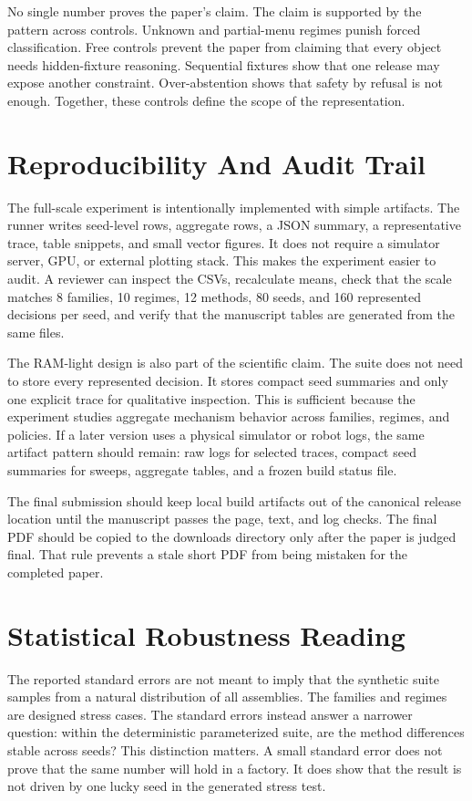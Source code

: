 \documentclass{article}
\begin{document}
No single number proves the paper's claim. The claim is supported by the
pattern across controls. Unknown and partial-menu regimes punish forced
classification. Free controls prevent the paper from claiming that every
object needs hidden-fixture reasoning. Sequential fixtures show that one
release may expose another constraint. Over-abstention shows that safety by
refusal is not enough. Together, these controls define the scope of the
representation.

\section{Reproducibility And Audit Trail}

The full-scale experiment is intentionally implemented with simple artifacts.
The runner writes seed-level rows, aggregate rows, a JSON summary, a
representative trace, table snippets, and small vector figures. It does not
require a simulator server, GPU, or external plotting stack. This makes the
experiment easier to audit. A reviewer can inspect the CSVs, recalculate
means, check that the scale matches 8 families, 10 regimes, 12 methods, 80
seeds, and 160 represented decisions per seed, and verify that the manuscript
tables are generated from the same files.

The RAM-light design is also part of the scientific claim. The suite does not
need to store every represented decision. It stores compact seed summaries and
only one explicit trace for qualitative inspection. This is sufficient because
the experiment studies aggregate mechanism behavior across families, regimes,
and policies. If a later version uses a physical simulator or robot logs, the
same artifact pattern should remain: raw logs for selected traces, compact
seed summaries for sweeps, aggregate tables, and a frozen build status file.

The final submission should keep local build artifacts out of the canonical
release location until the manuscript passes the page, text, and log checks.
The final PDF should be copied to the downloads directory only after the
paper is judged final. That rule prevents a stale short PDF from being mistaken
for the completed paper.

\section{Statistical Robustness Reading}

The reported standard errors are not meant to imply that the synthetic suite
samples from a natural distribution of all assemblies. The families and
regimes are designed stress cases. The standard errors instead answer a
narrower question: within the deterministic parameterized suite, are the
method differences stable across seeds? This distinction matters. A small
standard error does not prove that the same number will hold in a factory. It
does show that the result is not driven by one lucky seed in the generated
stress test.
\end{document}
